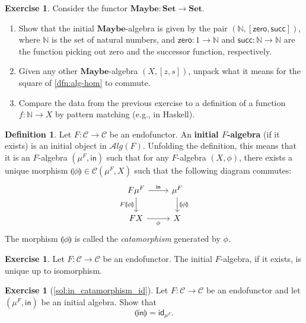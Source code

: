 \documentclass[a4paper,11pt, oneside,titlepage=false]{scrbook}
\theoremstyle{plain}
\theoremstyle{definition}
\newtheorem{dfn}[thm]{Definition}
\newtheorem{exer}[thm]{Exercise}
\newcommand{\cfont}[1]{\ensuremath{\mathsf{#1}}}
\newcommand{\Cat}[1]{\mathcal{#1}}
\newcommand{\CC}{\Cat{C}}
\newcommand{\Catb}[1]{\mathbf{#1}}
\newcommand{\Maybe}{\Catb{Maybe}}
\newcommand{\SET}{\Catb{Set}}
\newcommand{\ALG}[1]{\Cat{A}lg(#1)}
\newcommand{\CHom}[3]{{#1}(#2,#3)}
\newcommand{\Id}[1][]{\cfont{id}_{#1}}
\newcommand{\Initalg}[1]{\ensuremath{\mu^{#1}}}
\newcommand{\catam}[1]{\llparenthesis #1 \rrparenthesis}
\newcommand{\In}{\ensuremath{\mathsf{in}}}
\newcommand{\NN}{\ensuremath{\mathbb{N}}}
\newcommand{\Zero}{\ensuremath{\mathsf{zero}}}
\newcommand{\Succ}{\ensuremath{\mathsf{succ}}}
\begin{document}
\begin{exer}
  Consider the functor $\Maybe : \SET \to \SET$.
  \begin{enumerate}
  \item Show that the initial $\Maybe$-algebra is given by the pair $(\NN, [\Zero,\Succ])$,
    where $\NN$ is the set of natural numbers, and $\Zero : 1 \to \NN$ and $\Succ : \NN\to\NN$
    are the function picking out zero and the successor function, respectively.
  \item Given any other $\Maybe$-algebra $(X,[z,s])$, unpack what it means for the square of \cref{dfn:alg-hom} to commute.
  \item Compare the data from the previous exercise to a definition of a function $f : \NN \to X$ by pattern matching (e.g., in Haskell).
  \end{enumerate}
\end{exer}

\begin{dfn}\label{dfn:initial-alg}
  Let $F:\CC\to\CC$ be an endofunctor. An \textbf{initial $F$-algebra} (if it exists) is an initial object in $\ALG{F}$.
  Unfolding the definition, this means that it is an $F$-algebra $(\Initalg{F}, \In)$ such that for any $F$-algebra $(X,\phi)$, there exists a unique morphism $\catam{\phi} \in \CHom{\CC}{\Initalg{F}}{X}$ such that the following diagram commutes:
\begin{equation}\label{eq:initial-f-alg}
\begin{tikzcd}
{F\Initalg{F}}
\arrow[r, "\In"]
\arrow[d,swap, "F\catam{\phi}"]
& {\Initalg{F}}
\arrow[d, "\catam{\phi}"]
\\
FX
\arrow[r, swap, "\phi"]
& X
\end{tikzcd}
\end{equation}
The morphism $\catam{\phi}$ is called the \emph{catamorphism} generated by $\phi$.
\end{dfn}

\begin{exer}
Let $F : \CC \to \CC$ be an endofunctor.
The initial $F$-algebra, if it exists, is unique up to isomorphism.
\end{exer}

\begin{exer}[\cref{sol:in_catamorphism_id}]\label{exer:in_catamorphism_id}
  Let $F:\CC\to\CC$ be an endofunctor and let $(\Initalg F, \In)$ be an initial algebra.
  Show that
  \[\catam{\In} = \Id[\Initalg{F}].\]
\end{exer}
\end{document}
